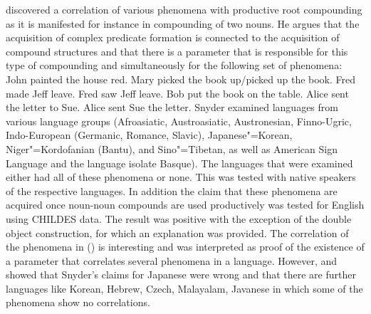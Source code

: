 \citet{Snyder2001a} discovered a correlation of various phenomena with productive root compounding
as it is manifested for instance in compounding of two nouns. He argues that the acquisition of
complex predicate formation is connected to the acquisition of compound structures and that there is
a parameter that is responsible for this type of compounding and simultaneously for the following set of
phenomena:
\eal\settowidth{}
\ex John painted the house red.                 
\ex Mary picked the book up/picked up the book. 
\ex Fred made Jeff leave.                       
\ex Fred saw Jeff leave.                        
\ex Bob put the book on the table.              
\ex Alice sent the letter to Sue.               
\ex Alice sent Sue the letter.                  
\zl 
Snyder examined languages from various language groups (Afroasiatic, Austroasiatic, Austronesian,
Finno-Ugric, Indo-European (Germanic, Romance, Slavic), Japanese"=Korean, Niger"=Kordofanian (Bantu),
and Sino"=Tibetan, as well as American Sign Language and the language isolate Basque). The languages
that were examined either had all of these phenomena or none. This was tested with native speakers
of the respective languages. In addition the claim that these phenomena are acquired once noun-noun
compounds are used productively was tested for English using CHILDES data. The result was positive
with the exception of the double object construction, for which an explanation was provided. The
correlation of the phenomena in () is interesting and was interpreted as proof of the
existence of a parameter that correlates several phenomena in a language. However, \citet{Son2007a}
and \citet{SonS2008a} showed that Snyder's claims for Japanese were wrong and that there
are further languages like Korean, Hebrew, Czech,
Malayalam, Javanese  in which some of the phenomena show no correlations. 

